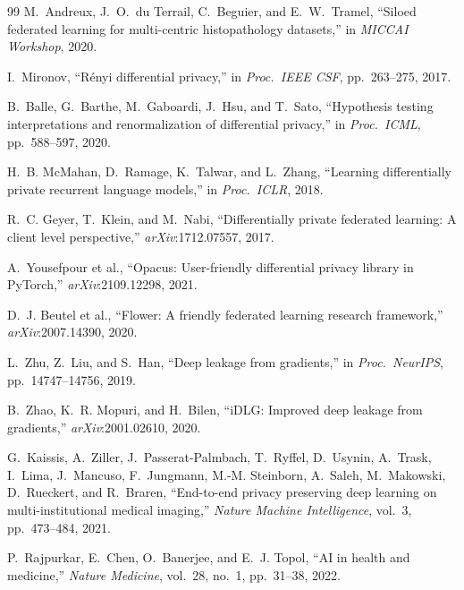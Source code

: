 \documentclass[10pt,journal,compsoc]{IEEEtran}
\begin{document}
\begin{thebibliography}{99}
M.~Andreux, J.~O.~du Terrail, C.~Beguier, and E.~W.~Tramel,
``Siloed federated learning for multi-centric histopathology
datasets,'' in \emph{MICCAI Workshop}, 2020.

I.~Mironov, ``Rényi differential privacy,''
in \emph{Proc.\ IEEE CSF}, pp.~263--275, 2017.

B.~Balle, G.~Barthe, M.~Gaboardi, J.~Hsu, and T.~Sato,
``Hypothesis testing interpretations and renormalization of
differential privacy,''
in \emph{Proc.\ ICML}, pp.~588--597, 2020.

H.~B. McMahan, D.~Ramage, K.~Talwar, and L.~Zhang,
``Learning differentially private recurrent language models,''
in \emph{Proc.\ ICLR}, 2018.

R.~C. Geyer, T.~Klein, and M.~Nabi,
``Differentially private federated learning: A client level
perspective,''
\emph{arXiv}:1712.07557, 2017.

A.~Yousefpour et al.,
``Opacus: User-friendly differential privacy library in PyTorch,''
\emph{arXiv}:2109.12298, 2021.

D.~J. Beutel et al.,
``Flower: A friendly federated learning research framework,''
\emph{arXiv}:2007.14390, 2020.

L.~Zhu, Z.~Liu, and S.~Han,
``Deep leakage from gradients,''
in \emph{Proc.\ NeurIPS}, pp.~14747--14756, 2019.

B.~Zhao, K.~R. Mopuri, and H.~Bilen,
``iDLG: Improved deep leakage from gradients,''
\emph{arXiv}:2001.02610, 2020.

G.~Kaissis, A.~Ziller, J.~Passerat-Palmbach,
T.~Ryffel, D.~Usynin, A.~Trask, I.~Lima,
J.~Mancuso, F.~Jungmann, M.-M. Steinborn,
A.~Saleh, M.~Makowski, D.~Rueckert, and R.~Braren,
``End-to-end privacy preserving deep learning on multi-institutional
medical imaging,''
\emph{Nature Machine Intelligence}, vol.~3, pp.~473--484, 2021.

P.~Rajpurkar, E.~Chen, O.~Banerjee, and E.~J. Topol,
``AI in health and medicine,''
\emph{Nature Medicine}, vol.~28, no.~1, pp.~31--38, 2022.

\end{thebibliography}
\end{document}
